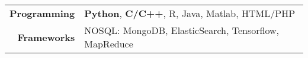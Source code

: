 
\tabcolsep=0.11cm
\begin{tabular}{rl}
  \textbf{Programming} & {\bf Python}, {\bf C/C++}, R, Java, Matlab,
  HTML/PHP\\
  \textbf{Frameworks} & NOSQL: MongoDB, ElasticSearch, Tensorflow,
  MapReduce\\
\end{tabular}


